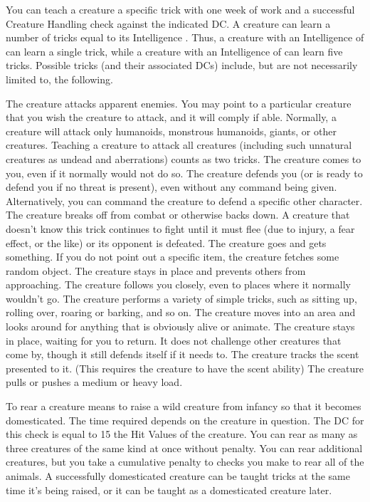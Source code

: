  You can teach a creature a specific trick with one week of work and a successful Creature Handling check against the indicated DC. A creature can learn a number of tricks equal to its Intelligence . Thus, a creature with an Intelligence of  can learn a single trick, while a creature with an Intelligence of  can learn five tricks. Possible tricks (and their associated DCs) include, but are not necessarily limited to, the following.

 The creature attacks apparent enemies. You may point to a particular creature that you wish the creature to attack, and it will comply if able. Normally, a creature will attack only humanoids, monstrous humanoids, giants, or other creatures. Teaching a creature to attack all creatures (including such unnatural creatures as undead and aberrations) counts as two tricks.
 The creature comes to you, even if it normally would not do so.
 The creature defends you (or is ready to defend you if no threat is present), even without any command being given. Alternatively, you can command the creature to defend a specific other character.
 The creature breaks off from combat or otherwise backs down. A creature that doesn't know this trick continues to fight until it must flee (due to injury, a fear effect, or the like) or its opponent is defeated.
 The creature goes and gets something. If you do not point out a specific item, the creature fetches some random object.
 The creature stays in place and prevents others from approaching.
 The creature follows you closely, even to places where it normally wouldn't go.
 The creature performs a variety of simple tricks, such as sitting up, rolling over, roaring or barking, and so on.
 The creature moves into an area and looks around for anything that is obviously alive or animate.
 The creature stays in place, waiting for you to return. It does not challenge other creatures that come by, though it still defends itself if it needs to.
 The creature tracks the scent presented to it. (This requires the creature to have the scent ability)
 The creature pulls or pushes a medium or heavy load.

 To rear a creature means to raise a wild creature from infancy so that it becomes domesticated. The time required depends on the creature in question. The DC for this check is equal to 15 \add the Hit Values of the creature. You can rear as many as three creatures of the same kind at once without penalty. You can rear additional creatures, but you take a cumulative  penalty to checks you make to rear all of the animals. A successfully domesticated creature can be taught tricks at the same time it's being raised, or it can be taught as a domesticated creature later.
